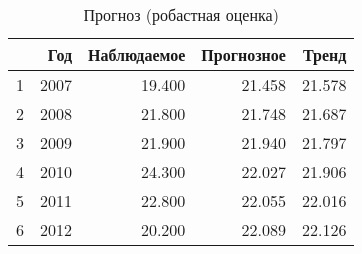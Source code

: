 \begin{table}[ht]
\centering
\begin{tabular}{rrrrr}
  \hline
 & Год & Наблюдаемое & Прогнозное & Тренд \\ 
  \hline
1 & 2007 & 19.400 & 21.458 & 21.578 \\ 
  2 & 2008 & 21.800 & 21.748 & 21.687 \\ 
  3 & 2009 & 21.900 & 21.940 & 21.797 \\ 
  4 & 2010 & 24.300 & 22.027 & 21.906 \\ 
  5 & 2011 & 22.800 & 22.055 & 22.016 \\ 
  6 & 2012 & 20.200 & 22.089 & 22.126 \\ 
   \hline
\end{tabular}
\caption{Прогноз (робастная оценка)} 
\label{table:prediction-robust}
\end{table}
